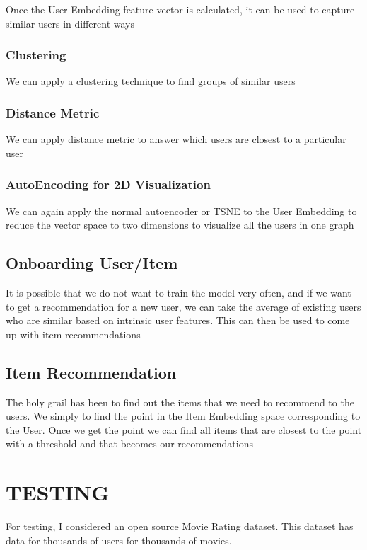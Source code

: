 \documentclass[letterpaper,twocolumn,10pt]{article}
\begin{document}
Once the User Embedding feature vector is calculated, it can be used to capture similar users in different ways
\subsubsection { Clustering }
We can apply a clustering technique to find groups of similar users

\subsubsection { Distance Metric }
We can apply distance metric to answer which users are closest to a particular user

\subsubsection { AutoEncoding for 2D Visualization }
We can again apply the normal autoencoder or TSNE to the User Embedding to reduce the vector space to two dimensions to visualize all the users in one graph


\subsection{Onboarding User/Item}
It is possible that we do not want to train the model very often, and if we want to get a recommendation for a new user, we can take the average of existing users who are similar based on intrinsic user features. This can then be used to come up with item recommendations

\subsection{Item Recommendation}
The holy grail has been to find out the items that we need to recommend to the users. We simply to find the point in the Item Embedding space corresponding to the User. Once we get the point we can find all items that are closest to the point with a threshold and that becomes our recommendations


\section {TESTING}

For testing, I considered an open source Movie Rating dataset. This dataset has data for thousands of users for thousands of movies. 

{\footnotesize 
}


\theendnotes
\end{document}
